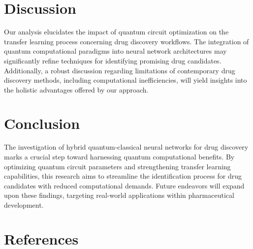 \documentclass{article}
\begin{document}
\section{Discussion}
Our analysis elucidates the impact of quantum circuit optimization on the transfer learning process concerning drug discovery workflows. The integration of quantum computational paradigms into neural network architectures may significantly refine techniques for identifying promising drug candidates. Additionally, a robust discussion regarding limitations of contemporary drug discovery methods, including computational inefficiencies, will yield insights into the holistic advantages offered by our approach.

\section{Conclusion}
The investigation of hybrid quantum-classical neural networks for drug discovery marks a crucial step toward harnessing quantum computational benefits. By optimizing quantum circuit parameters and strengthening transfer learning capabilities, this research aims to streamline the identification process for drug candidates with reduced computational demands. Future endeavors will expand upon these findings, targeting real-world applications within pharmaceutical development.

\section{References}



\end{document}
